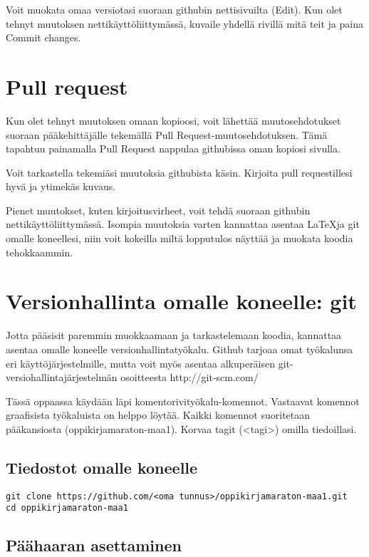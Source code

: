 Voit muokata omaa versiotasi suoraan githubin nettisivuilta (Edit). Kun olet tehnyt muutoksen nettikäyttöliittymässä, kuvaile yhdellä rivillä mitä teit ja paina Commit changes.

\section{Pull request}

Kun olet tehnyt muutoksen omaan kopioosi, voit lähettää muutosehdotukset suoraan pääkehittäjälle tekemällä Pull Request-muutosehdotuksen. Tämä tapahtuu painamalla Pull Request nappulaa githubissa oman kopiosi sivulla.

Voit tarkastella tekemiäsi muutoksia githubista käsin. Kirjoita pull requestillesi hyvä ja ytimekäs kuvaus.


Pienet muutokset, kuten kirjoitusvirheet, voit tehdä suoraan githubin nettikäyttöliittymässä. Isompia muutoksia varten kannattaa asentaa \LaTeX ja git omalle koneellesi, niin voit kokeilla miltä lopputulos näyttää ja muokata koodia tehokkaammin.

\section{Versionhallinta omalle koneelle: git}

Jotta pääsisit paremmin muokkaamaan ja tarkastelemaan koodia, kannattaa asentaa omalle koneelle versionhallintatyökalu. Github tarjoaa omat työkalunsa eri käyttöjärjestelmille, mutta voit myös asentaa alkuperäisen git-versiohallintajärjestelmän osoitteesta http://git-scm.com/

Tässä oppaassa käydään läpi komentorivityökalu-komennot. Vastaavat komennot graafisista työkaluista on helppo löytää. Kaikki komennot suoritetaan pääkansiosta (oppikirjamaraton-maa1). Korvaa tagit (<tagi>) omilla tiedoillasi.

\subsection{Tiedostot omalle koneelle}

\begin{verbatim}
git clone https://github.com/<oma tunnus>/oppikirjamaraton-maa1.git
cd oppikirjamaraton-maa1
\end{verbatim}

\subsection{Päähaaran asettaminen}

